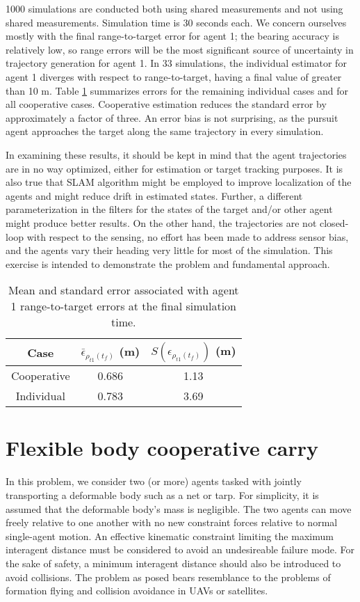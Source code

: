 \documentclass{aiaa-tc}
\begin{document}
1000 simulations are conducted both using shared measurements and not using shared measurements. Simulation time is 30 seconds each. We concern ourselves mostly with the final range-to-target error for agent 1; the bearing accuracy is relatively low, so range errors will be the most significant source of uncertainty in trajectory generation for agent 1. In 33 simulations, the individual estimator for agent 1 diverges with respect to range-to-target, having a final value of greater than 10 m. Table \ref{tab:mean_std_errs} summarizes errors for the remaining individual cases and for all cooperative cases. Cooperative estimation reduces the standard error by approximately a factor of three. An error bias is not surprising, as the pursuit agent approaches the target along the same trajectory in every simulation.

In examining these results, it should be kept in mind that the agent trajectories are in no way optimized, either for estimation or target tracking purposes. It is also true that SLAM algorithm might be employed to improve localization of the agents and might reduce drift in estimated states. Further, a different parameterization in the filters for the states of the target and/or other agent might produce better results. On the other hand, the trajectories are not closed-loop with respect to the sensing, no effort has been made to address sensor bias, and the agents vary their heading very little for most of the simulation. This exercise is intended to demonstrate the problem and fundamental approach.

\begin{table}
\centering
\begin{tabular}{|c|c|c|}
\hline
Case & $\bar{\epsilon}_{\rho_{t1}(t_f)}$ (m) &  $S(\epsilon_{\rho_{t1}(t_f)})$ (m)\\
\hline
Cooperative & 0.686 & 1.13\\
\hline
Individual & 0.783 & 3.69\\
\hline
\end{tabular}
\caption{Mean and standard error associated with agent 1 range-to-target errors at the final simulation time.}
\label{tab:mean_std_errs}
\end{table}

\section{Flexible body cooperative carry}

In this problem, we consider two (or more) agents tasked with jointly transporting a deformable body such as a net or tarp. For simplicity, it is assumed that the deformable body's mass is negligible. The two agents can move freely relative to one another with no new constraint forces relative to normal single-agent motion. An effective kinematic constraint limiting the maximum interagent distance must be considered to avoid an undesireable failure mode. For the sake of safety, a minimum interagent distance should also be introduced to avoid collisions. The problem as posed bears resemblance to the problems of formation flying and collision avoidance in UAVs or satellites.
\end{document}
